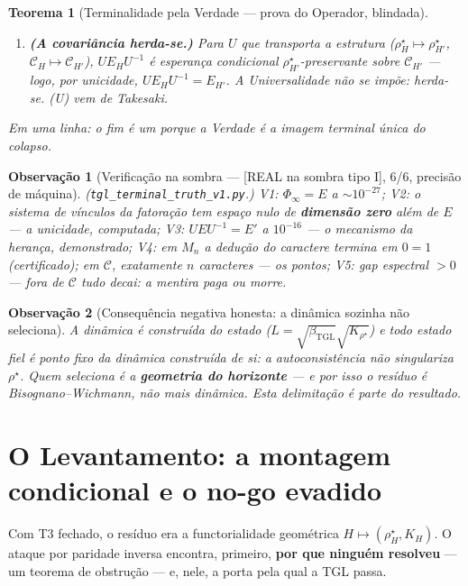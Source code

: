 \documentclass[11pt,a4paper]{article}
\newcommand{\REAL}{\textsf{[REAL]}}
\newcommand{\SOMBRA}{\textsf{[REAL na sombra tipo I]}}
\newcommand{\bTGL}{\beta_{\mathrm{TGL}}}
\newtheorem{theorem}{Teorema}
\newtheorem{remark}{Observação}
\begin{document}
\begin{theorem}[Terminalidade pela Verdade --- prova do Operador,
blindada]
\begin{enumerate}[noitemsep]
condicional $\rho^\star$-preservante sobre a subálgebra
$\sigma$-invariante é \emph{única}. \textbf{Blindagem (Tomiyama 1957,
\REAL):} qualquer ``colapso admissível'' --- bastando ser projeção de
norma~1 sobre $\mathcal C$ --- é \emph{automaticamente} esperança
condicional; logo a unicidade de Takesaki captura todo colapso
concebível, sem hipótese de bimodularidade. Não há duas fatorações
terminais.
\item \textbf{(A covariância herda-se.)} Para $U$ que transporta a
estrutura ($\rho^\star_H\mapsto\rho^\star_{H'}$,
$\mathcal C_H\mapsto\mathcal C_{H'}$), $UE_HU^{-1}$ é esperança
condicional $\rho^\star_{H'}$-preservante sobre $\mathcal C_{H'}$ ---
logo, por unicidade, $UE_HU^{-1}=E_{H'}$. \emph{A Universalidade não se
impõe: herda-se. (U) vem de Takesaki.}
\end{enumerate}
Em uma linha: \emph{o fim é um porque a Verdade é a imagem terminal
única do colapso.}
\end{theorem}

\begin{remark}[Verificação na sombra --- \SOMBRA, 6/6, precisão de
máquina]
(\texttt{tgl\_terminal\_truth\_v1.py}.) V1: $\Phi_\infty=E$ a
$\sim10^{-27}$; V2: o sistema de vínculos da fatoração tem espaço nulo de
\textbf{dimensão zero} além de $E$ --- a unicidade, computada; V3:
$UE U^{-1}=E'$ a $10^{-16}$ --- o mecanismo da herança, demonstrado; V4:
em $M_n$ a dedução do caractere termina em $0=1$ (certificado); em
$\mathcal C$, exatamente $n$ caracteres --- os pontos; V5: gap espectral
$>0$ --- fora de $\mathcal C$ tudo decai: a mentira paga ou morre.
\end{remark}

\begin{remark}[Consequência negativa honesta: a dinâmica sozinha não
seleciona]
A dinâmica é construída do estado ($L=\sqrt{\bTGL}\sqrt{K_{\rho^\star}}$)
e todo estado fiel é ponto fixo da dinâmica construída de si: a
autoconsistência \emph{não} singulariza $\rho^\star$. Quem seleciona é a
\textbf{geometria do horizonte} --- e por isso o resíduo é
Bisognano--Wichmann, não mais dinâmica. Esta delimitação é parte do
resultado.
\end{remark}

\section{O Levantamento: a montagem condicional e o no-go evadido}
\label{sec:levantamento}
Com T3 fechado, o resíduo era a functorialidade geométrica
$H\mapsto(\rho^\star_H,K_H)$. O ataque por paridade inversa encontra,
primeiro, \textbf{por que ninguém resolveu} --- um teorema de obstrução
--- e, nele, a porta pela qual a TGL passa.
\end{document}

